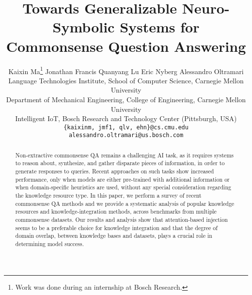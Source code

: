 \documentclass[11pt,a4paper]{article}
\title{Towards Generalizable Neuro-Symbolic Systems for Commonsense Question Answering}
\author{Kaixin Ma\thanks{Work was done during an internship at Bosch Research.} \quad Jonathan Francis \quad Quanyang Lu \quad Eric Nyberg \quad Alessandro Oltramari\\
  Language Technologies Institute, School of Computer Science, Carnegie Mellon University   \\
  Department of Mechanical Engineering, College of Engineering, Carnegie Mellon University \\
  Intelligent IoT, Bosch Research and Technology Center (Pittsburgh, USA) \\
  {\tt \{kaixinm, jmf1, qlv, ehn\}@cs.cmu.edu}\\ {\tt alessandro.oltramari@us.bosch.com} \\}
\date{}
\begin{document}
\maketitle

\begin{abstract}
Non-extractive commonsense QA remains a challenging AI task, as it requires systems to reason about, synthesize, and gather disparate pieces of information, in order to generate responses to queries. Recent approaches on such tasks show increased performance, only when models are either pre-trained with additional information or when domain-specific heuristics are used, without any special consideration regarding the knowledge resource type. In this paper, we perform a survey of recent commonsense QA methods and we provide a systematic analysis of popular knowledge resources and knowledge-integration methods, across benchmarks from multiple commonsense datasets. Our results and analysis show that attention-based injection seems to be a preferable choice for knowledge integration and that the degree of domain overlap, between knowledge bases and datasets, plays a crucial role in determining model success.
\end{abstract}
\end{document}
